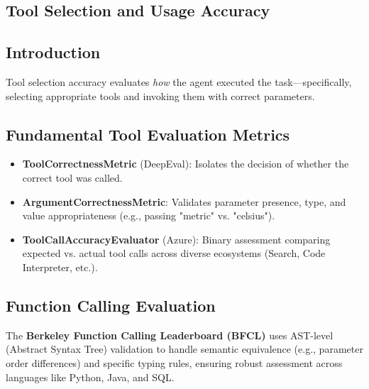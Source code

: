 \begin{TNtwocol}
\section{Tool Selection and Usage Accuracy }
\subsection{Introduction}
Tool selection accuracy evaluates \textit{how} the agent executed the task---specifically, selecting appropriate tools and invoking them with correct parameters.

\subsection{Fundamental Tool Evaluation Metrics}
\begin{itemize}
    \item \textbf{ToolCorrectnessMetric} (DeepEval): Isolates the decision of whether the correct tool was called.
    \item \textbf{ArgumentCorrectnessMetric}: Validates parameter presence, type, and value appropriateness (e.g., passing "metric" vs. "celsius").
    \item \textbf{ToolCallAccuracyEvaluator} (Azure): Binary assessment comparing expected vs. actual tool calls across diverse ecosystems (Search, Code Interpreter, etc.).
\end{itemize}

\subsection{Function Calling Evaluation}
The \textbf{Berkeley Function Calling Leaderboard (BFCL)} uses AST-level (Abstract Syntax Tree) validation to handle semantic equivalence (e.g., parameter order differences) and specific typing rules, ensuring robust assessment across languages like Python, Java, and SQL.
\end{TNtwocol}
